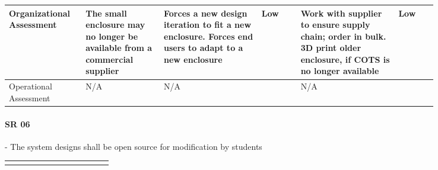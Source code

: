 \begin{landscape}
{\begin{longtable}{| p{0.12\linewidth} | p{0.16\linewidth} |  p{0.20\linewidth} | p{0.08\linewidth} | p{0.20\linewidth} | p{0.08\linewidth} |}
	\hline
	Organizational \newline Assessment & The small enclosure may no longer be available from a commercial supplier & Forces a new design iteration to fit a new enclosure. \newline Forces end users to adapt to a new enclosure & \cellcolor{green} Low & Work with supplier to ensure supply chain; order in bulk. \newline 3D print older enclosure, if COTS is no longer available & \cellcolor{green} Low \\
	\hline
	Operational \newline Assessment & N/A & N/A & \cellcolor[gray]{0.8} & N/A & \cellcolor[gray]{0.8}
	\label{tab:sr05_feasibility}
\end{longtable}
}
\newpage




\paragraph*{SR 06} - The system designs shall be open source for modification by students

{\fontsize{8pt}{8pt}\selectfont
\begin{longtable}{| p{0.12\linewidth} | p{0.16\linewidth} |  p{0.20\linewidth} | p{0.08\linewidth} | p{0.20\linewidth} | p{0.08\linewidth} |}
	\hline \endlastfoot
	

\end{longtable}}
\end{landscape}
